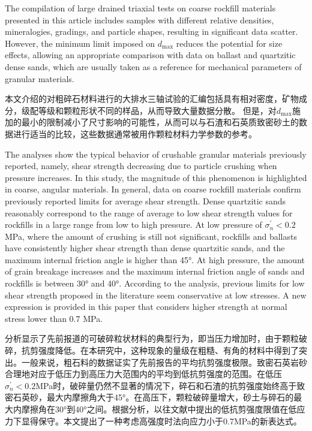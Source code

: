 \begin{ParaColumn}
    
    The compilation of large drained triaxial tests on coarse rockfill materials presented in this article includes samples with different relative densities, mineralogies, gradings, and particle shapes, resulting in significant data scatter. However, the minimum limit imposed on $d_{\max}$ reduces the potential for size effects, allowing an appropriate comparison with data on ballast and quartzitic dense sands, which are usually taken as a reference for mechanical parameters of granular materials.

    \switchcolumn

    本文介绍的对粗碎石材料进行的大排水三轴试验的汇编包括具有相对密度，矿物成分，级配等级和颗粒形状不同的样品，从而导致大量数据分散。 但是，对$d_{\max}$施加的最小的限制减小了尺寸影响的可能性，从而可以与石渣和石英质致密砂土的数据进行适当的比较，这些数据通常被用作颗粒材料力学参数的参考。
    
    \switchcolumn*

    The analyses show the typical behavior of crushable granular materials previously reported, namely, shear strength decreasing due to particle crushing when pressure increases. In this study, the magnitude of this phenomenon is highlighted in coarse, angular materials. In general, data on coarse rockfill materials confirm previously reported limits for average shear strength. Dense quartzitic sands reasonably correspond to the range of average to low shear strength values for rockfills in a large range from low to high pressure. At low pressure of $\sigma_n^\prime<0.2$ MPa, where the amount of crushing is still not significant, rockfills and ballasts have consistently higher shear strength than dense quartzitic sands, and the maximum internal friction angle is higher than 45°. At high pressure, the amount of grain breakage increases and the maximum internal friction angle of sands and rockfills is between 30° and 40°. According to the analysis, previous limits for low shear strength proposed in the literature seem conservative at low stresses. A new expression is provided in this paper that considers higher strength at normal stress lower than 0.7 MPa.

    \switchcolumn

    分析显示了先前报道的可破碎粒状材料的典型行为，即当压力增加时，由于颗粒破碎，抗剪强度降低。在本研究中，这种现象的量级在粗糙、有角的材料中得到了突出。一般来说，粗石料的数据证实了先前报告的平均抗剪强度极限。致密石英岩砂合理地对应于低压力到高压力大范围内的平均到低抗剪强度的范围。在低压$\sigma_n^\prime<0.2$MPa时，破碎量仍然不显著的情况下，碎石和石渣的抗剪强度始终高于致密石英砂，最大内摩擦角大于45°。在高压下，颗粒破碎量增大，砂土与碎石的最大内摩擦角在30°到40°之间。根据分析，以往文献中提出的低抗剪强度限值在低应力下显得保守。本文提出了一种考虑高强度时法向应力小于0.7MPa的新表达式。


\end{ParaColumn}
